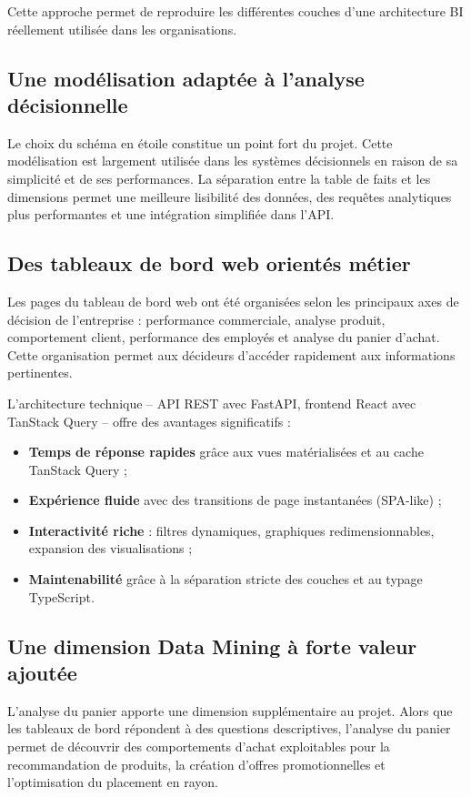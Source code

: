 \documentclass[12pt,a4paper,twoside]{report}
\begin{document}
Cette approche permet de reproduire les différentes couches d'une architecture BI réellement utilisée dans les organisations.

\subsection{Une modélisation adaptée à l'analyse décisionnelle}

Le choix du schéma en étoile constitue un point fort du projet. Cette modélisation est largement utilisée dans les systèmes décisionnels en raison de sa simplicité et de ses performances. La séparation entre la table de faits et les dimensions permet une meilleure lisibilité des données, des requêtes analytiques plus performantes et une intégration simplifiée dans l'API.

\subsection{Des tableaux de bord web orientés métier}

Les pages du tableau de bord web ont été organisées selon les principaux axes de décision de l'entreprise : performance commerciale, analyse produit, comportement client, performance des employés et analyse du panier d'achat. Cette organisation permet aux décideurs d'accéder rapidement aux informations pertinentes.

L'architecture technique -- API REST avec FastAPI, frontend React avec TanStack Query -- offre des avantages significatifs :
\begin{itemize}
    \item \textbf{Temps de réponse rapides} grâce aux vues matérialisées et au cache TanStack Query ;
    \item \textbf{Expérience fluide} avec des transitions de page instantanées (SPA-like) ;
    \item \textbf{Interactivité riche} : filtres dynamiques, graphiques redimensionnables, expansion des visualisations ;
    \item \textbf{Maintenabilité} grâce à la séparation stricte des couches et au typage TypeScript.
\end{itemize}

\subsection{Une dimension Data Mining à forte valeur ajoutée}

L'analyse du panier apporte une dimension supplémentaire au projet. Alors que les tableaux de bord répondent à des questions descriptives, l'analyse du panier permet de découvrir des comportements d'achat exploitables pour la recommandation de produits, la création d'offres promotionnelles et l'optimisation du placement en rayon.
\end{document}
